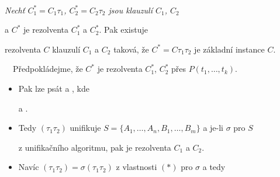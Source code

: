     {\bf {}}\ \ {\it Nechť $C^*_1=C_1\tau_1$, $C^*_2=C_2\tau_2$ jsou  klauzulí $C_1$, $C_2$
    \smallskip
    
     a $C^*$ je rezolventa $C^*_1$ a $C^*_2$. Pak existuje
    \smallskip
    
    rezolventa $C$ klauzulí $C_1$ a $C_2$ taková, že $C^*=C\tau_1\tau_2$ je základní instance $C$.}
    \medskip
    
    {\it {}}\ \ Předpokládejme, že $C^*$ je rezolventa $C_1^*$, $C_2^*$ přes   $P(t_1,\dots,t_k)$.
    \vspace{0.5mm}
    
    \begin{itemize}
    \item Pak lze psát  a , kde
    \smallskip
    
     a .
    \smallskip
    
    \item Tedy $(\tau_1\tau_2)$ unifikuje $S=\{A_1,\dots,A_n,B_1,\dots,B_m\}$ a je-li $\sigma$  pro $S$
    \smallskip
    
    z unifikačního algoritmu, pak  je rezolventa $C_1$ a $C_2$.
    \smallskip
    
    \item Navíc $(\tau_1\tau_2)=\sigma(\tau_1\tau_2)$ z vlastnosti $(*)$ pro $\sigma$ a tedy
    \vspace{-2mm}
    \end{itemize}
    
    
    \vspace{-8mm}
    

